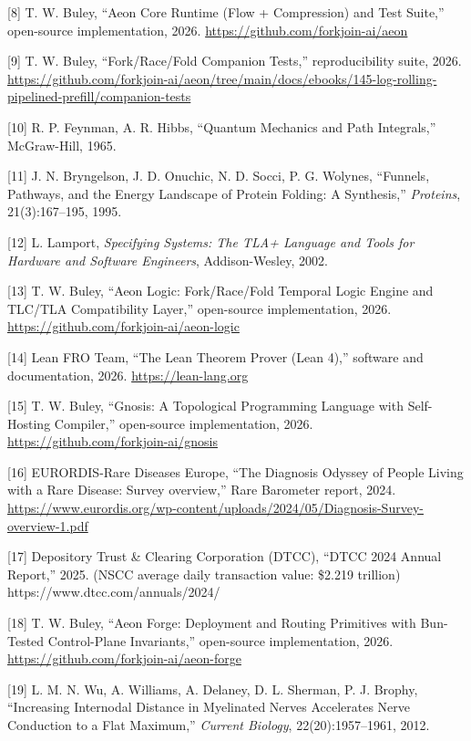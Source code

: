 \documentclass[
  11pt,
]{article}
\begin{document}
{[}8{]} T. W. Buley, ``Aeon Core Runtime (Flow + Compression) and Test
Suite,'' open-source implementation, 2026.
\url{https://github.com/forkjoin-ai/aeon}

{[}9{]} T. W. Buley, ``Fork/Race/Fold Companion Tests,'' reproducibility
suite, 2026.
\url{https://github.com/forkjoin-ai/aeon/tree/main/docs/ebooks/145-log-rolling-pipelined-prefill/companion-tests}

{[}10{]} R. P. Feynman, A. R. Hibbs, ``Quantum Mechanics and Path
Integrals,'' McGraw-Hill, 1965.

{[}11{]} J. N. Bryngelson, J. D. Onuchic, N. D. Socci, P. G. Wolynes,
``Funnels, Pathways, and the Energy Landscape of Protein Folding: A
Synthesis,'' \emph{Proteins}, 21(3):167--195, 1995.

{[}12{]} L. Lamport, \emph{Specifying Systems: The TLA+ Language and
Tools for Hardware and Software Engineers}, Addison-Wesley, 2002.

{[}13{]} T. W. Buley, ``Aeon Logic: Fork/Race/Fold Temporal Logic Engine
and TLC/TLA Compatibility Layer,'' open-source implementation, 2026.
\url{https://github.com/forkjoin-ai/aeon-logic}

{[}14{]} Lean FRO Team, ``The Lean Theorem Prover (Lean 4),'' software
and documentation, 2026. \url{https://lean-lang.org}

{[}15{]} T. W. Buley, ``Gnosis: A Topological Programming Language with
Self-Hosting Compiler,'' open-source implementation, 2026.
\url{https://github.com/forkjoin-ai/gnosis}

{[}16{]} EURORDIS-Rare Diseases Europe, ``The Diagnosis Odyssey of
People Living with a Rare Disease: Survey overview,'' Rare Barometer
report, 2024.
\url{https://www.eurordis.org/wp-content/uploads/2024/05/Diagnosis-Survey-overview-1.pdf}

{[}17{]} Depository Trust \& Clearing Corporation (DTCC), ``DTCC 2024
Annual Report,'' 2025. (NSCC average daily transaction value: \$2.219
trillion) https://www.dtcc.com/annuals/2024/

{[}18{]} T. W. Buley, ``Aeon Forge: Deployment and Routing Primitives
with Bun-Tested Control-Plane Invariants,'' open-source implementation,
2026. \url{https://github.com/forkjoin-ai/aeon-forge}

{[}19{]} L. M. N. Wu, A. Williams, A. Delaney, D. L. Sherman, P. J.
Brophy, ``Increasing Internodal Distance in Myelinated Nerves
Accelerates Nerve Conduction to a Flat Maximum,'' \emph{Current
Biology}, 22(20):1957--1961, 2012.
\end{document}
